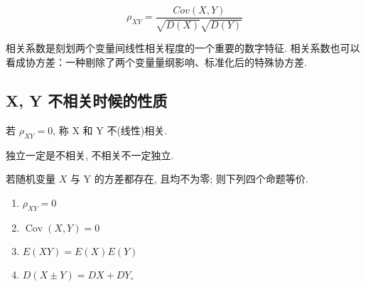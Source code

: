 $$
 \rho_{XY} =   \frac{Cov(X,Y) }{\sqrt{D(X)} \sqrt{D(Y)}}
$$

相关系数是刻划两个变量间线性相关程度的一个重要的数字特征. 相关系数也可以看成协方差：一种剔除了两个变量量纲影响、标准化后的特殊协方差. 

\subsection{X, Y 不相关时候的性质}

若 $\rho_{X Y}=0$, 称 X 和 Y 不(线性)相关. 

\begin{corollary}
    独立一定是不相关, 不相关不一定独立. 
\end{corollary}

\begin{theorem}
    若随机变量 $X$ 与 Y 的方差都存在, 且均不为零; 则下列四个命题等价. 
    \begin{enumerate}
        \item $\rho_{X Y}=0$
        \item $\operatorname{Cov}(X, Y)=0$
        \item $E(X Y)=E (X) E (Y)$
        \item $D(X \pm Y)=D X+D Y_{\circ}$
    \end{enumerate}
\end{theorem}